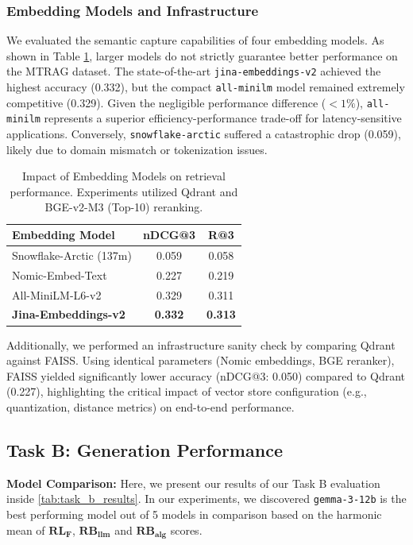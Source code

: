 \documentclass[11pt]{article}
\begin{document}
\subsubsection{Embedding Models and Infrastructure}
We evaluated the semantic capture capabilities of four embedding models. As shown in Table \ref{tab:embeddings}, larger models do not strictly guarantee better performance on the MTRAG dataset. The state-of-the-art \texttt{jina-embeddings-v2} achieved the highest accuracy (0.332), but the compact \texttt{all-minilm} model remained extremely competitive (0.329). Given the negligible performance difference ($<1\%$), \texttt{all-minilm} represents a superior efficiency-performance trade-off for latency-sensitive applications. Conversely, \texttt{snowflake-arctic} suffered a catastrophic drop (0.059), likely due to domain mismatch or tokenization issues.

\begin{table}[h]
\centering
\small
\begin{tabular}{lcc}
\hline
\textbf{Embedding Model} & \textbf{nDCG@3} & \textbf{R@3} \\
\hline
Snowflake-Arctic (137m) & 0.059 & 0.058 \\
Nomic-Embed-Text & 0.227 & 0.219 \\
All-MiniLM-L6-v2 & 0.329 & 0.311 \\
\textbf{Jina-Embeddings-v2} & \textbf{0.332} & \textbf{0.313} \\
\hline
\end{tabular}
\caption{Impact of Embedding Models on retrieval performance. Experiments utilized Qdrant and BGE-v2-M3 (Top-10) reranking.}
\label{tab:embeddings}
\end{table}

Additionally, we performed an infrastructure sanity check by comparing Qdrant against FAISS. Using identical parameters (Nomic embeddings, BGE reranker), FAISS yielded significantly lower accuracy (nDCG@3: 0.050) compared to Qdrant (0.227), highlighting the critical impact of vector store configuration (e.g., quantization, distance metrics) on end-to-end performance.

\subsection{Task B: Generation Performance}

\textbf{Model Comparison:} Here, we present our results of our Task B evaluation inside \ref{tab:task_b_results}. In our experiments, we discovered \texttt{gemma-3-12b} is the best performing model out of 5 models in comparison based on the harmonic mean of  $\mathbf{RL_{F}}$, $\mathbf{RB_{llm}}$ and $\mathbf{RB_{alg}}$ scores.
\end{document}
